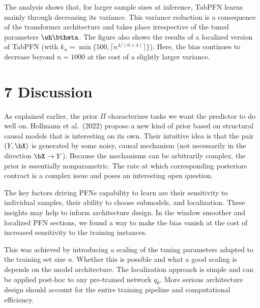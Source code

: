 \documentclass[aspectratio=169,10pt]{beamer}
\newcommand{\currentheading}{\ifx\insertsubsection\empty\insertsection\else\insertsubsection\fi}
\begin{document}
\begin{frame}{\currentheading}
The analysis shows that, for larger sample sizes at inference, TabPFN learns mainly through decreasing its variance. This variance reduction is a consequence of the transformer architecture and takes place irrespective of the tuned parameters $\wh \btheta$. The figure also shows the results of a localized version of TabPFN (with $k_n = \min\{500, \lceil n^{4/(d + 4)} \rceil\}$). Here, the bias continues to decrease beyond $n = 1000$ at the cost of a slightly larger variance.
\end{frame}

\section{7 Discussion}

\begin{frame}{\currentheading}
As explained earlier, the prior $\Pi$ characterizes tasks we want the predictor to do well on. Hollmann et al.\ (2022) propose a new kind of prior based on structural causal models that is interesting on its own. Their intuitive idea is that the pair $(Y, \bX)$ is generated by some noisy, causal mechanism (not necessarily in the direction $\bX \to Y$). Because the mechanisms can be arbitrarily complex, the prior is essentially nonparametric. The rate at which corresponding posteriors contract is a complex issue and poses an interesting open question.
\end{frame}

\begin{frame}{\currentheading}
The key factors driving PFNs capability to learn are their sensitivity to individual samples, their ability to choose submodels, and localization. These insights may help to inform architecture design. In the window smoother and localized PFN sections, we found a way to make the bias vanish at the cost of increased sensitivity to the training instances.
\end{frame}

\begin{frame}{\currentheading}
This was achieved by introducing a scaling of the tuning parameters adapted to the training set size $n$. Whether this is possible and what a good scaling is depends on the model architecture. The localization approach is simple and can be applied post-hoc to any pre-trained network $q_\theta$. More serious architecture design should account for the entire training pipeline and computational efficiency.
\end{frame}
\end{document}
